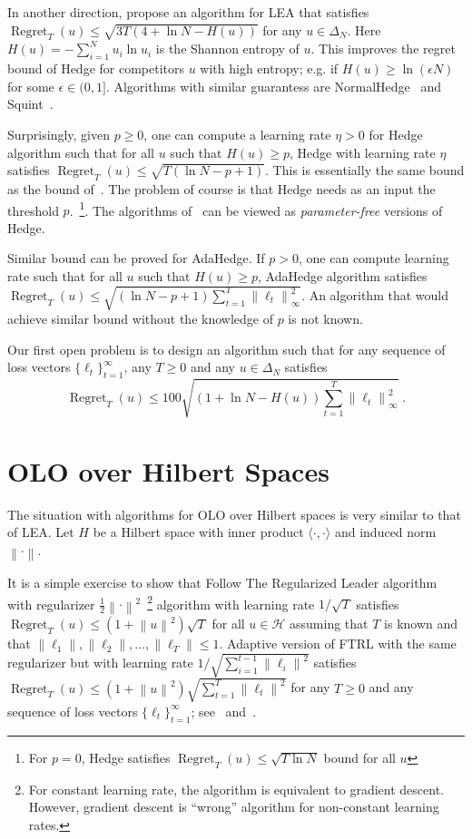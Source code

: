 \documentclass{colt2016} %
\DeclareMathOperator{\Regret}{Regret}
\renewcommand{\H}{\mathcal{H}}  %
\newcommand{\norm}[1]{\left\|{#1}\right\|}
\begin{document}
In another direction, \cite{Orabona-Pal-2016} propose an algorithm for LEA that
satisfies $\Regret_T(u) \le \sqrt{3 T(4 + \ln N - H(u))}$ for any $u \in
\Delta_N$. Here $H(u) = -\sum_{i=1}^N u_i \ln u_i$ is the Shannon entropy of
$u$. This improves the regret bound of Hedge for competitors $u$ with high
entropy; e.g. if $H(u) \ge \ln (\epsilon N)$ for some $\epsilon \in (0,1]$.
Algorithms with similar guarantess are NormalHedge~\cite{} and Squint~\cite{}.

Surprisingly, given $p \ge 0$, one can compute a learning rate $\eta > 0$ for
Hedge algorithm such that for all $u$ such that $H(u) \ge p$, Hedge with
learning rate $\eta$ satisfies $\Regret_T(u) \le \sqrt{T (\ln N - p + 1)}$. This
is essentially the same bound as the bound of~\cite{Orabona-Pal-2016}. The
problem of course is that Hedge needs as an input the threshold
$p$.~\footnote{For $p = 0$, Hedge satisfies  $\Regret_T(u) \le \sqrt{T \ln N}$
bound for all $u$}. The algorithms of~\cite{Orabona-Pal-2016, ???} can be viewed
as \emph{parameter-free} versions of Hedge.

Similar bound can be proved for AdaHedge. If $p > 0$, one can compute learning
rate such that for all $u$ such that $H(u) \ge p$, AdaHedge algorithm satisfies
$\Regret_T(u) \le \sqrt{(\ln N - p + 1) \sum_{t=1}^T \norm{\ell_t}_\infty^2}$. An
algorithm that would achieve similar bound without the knowledge of $p$ is not
known.

Our first open problem is to design an algorithm such that for any
sequence of loss vectors $\{\ell_t\}_{t=1}^\infty$, any $T \ge 0$
and any $u \in \Delta_N$ satisfies
$$
\Regret_T(u) \le 100\sqrt{(1 + \ln N - H(u)) \sum_{t=1}^T \norm{\ell_t}_\infty^2} \; .
$$

\section{OLO over Hilbert Spaces}

The situation with algorithms for OLO over Hilbert spaces is very similar to
that of LEA. Let $H$ be a Hilbert space with inner product $\langle \cdot, \cdot \rangle$
and induced norm $\norm{\cdot}$.

It is a simple exercise to show that Follow The Regularized Leader algorithm with
regularizer $\frac{1}{2}\norm{\cdot}^2$~\footnote{For constant learning rate, the
algorithm is equivalent to gradient descent. However, gradient descent is
``wrong'' algorithm for non-constant learning rates.} algorithm with learning
rate $1/\sqrt{T}$ satisfies $\Regret_T(u) \le (1 + \norm{u}^2) \sqrt{T}$ for all
$u \in \H$ assuming that $T$ is known and that $\norm{\ell_1}, \norm{\ell_2},
\dots, \norm{\ell_T} \le 1$. Adaptive version of FTRL with the same regularizer
but with learning rate $1/\sqrt{\sum_{i=1}^{t-1} \norm{\ell_i}^2}$ satisfies
$\Regret_T(u) \le (1+\norm{u}^2) \sqrt{\sum_{t=1}^T \norm{\ell_t}^2}$
for any $T \ge 0$ and any sequence of loss vectors $\{\ell_t\}_{t=1}^\infty$;
see~\cite{Orabona-Pal-2015} and~\cite{adagrad}.
\end{document}
